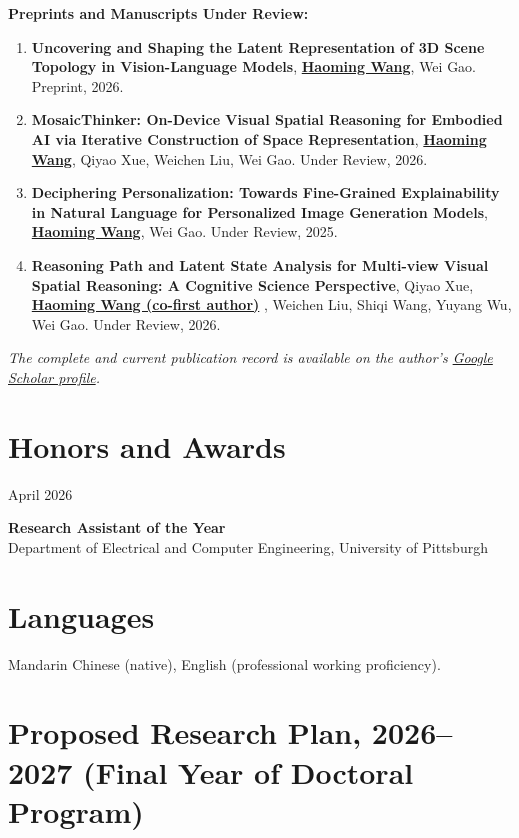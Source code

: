 \documentclass[11pt, letterpaper]{article}
\newenvironment{datedentry}[1]{%
  \par\noindent
  \begin{minipage}[t]{2.8cm}\raggedright\small #1\end{minipage}%
  \hspace{0.3cm}%
  \begin{minipage}[t]{\dimexpr\linewidth-3.1cm\relax}\raggedright
}{\end{minipage}\par\medskip}
\newenvironment{publist}{
  \begin{enumerate}[leftmargin=1.7em, itemsep=4pt, parsep=0pt, topsep=2pt,
                    label=\arabic*.]
}{\end{enumerate}}
\newcommand{\me}{\underline{\textbf{Haoming Wang}}}
\newcommand{\meco}{\underline{\textbf{Haoming Wang (co-first author)}} }
\begin{document}
\vspace{4pt}
\noindent\textbf{Preprints and Manuscripts Under Review:}
\begin{publist}
\item \textbf{Uncovering and Shaping the Latent Representation of 3D Scene Topology in Vision-Language Models}, \me, Wei Gao. Preprint, 2026.

\item \textbf{MosaicThinker: On-Device Visual Spatial Reasoning for Embodied AI via Iterative Construction of Space Representation}, \me, Qiyao Xue, Weichen Liu, Wei Gao. Under Review, 2026.

\item \textbf{Deciphering Personalization: Towards Fine-Grained Explainability in Natural Language for Personalized Image Generation Models}, \me, Wei Gao. Under Review, 2025.

\item \textbf{Reasoning Path and Latent State Analysis for Multi-view Visual Spatial Reasoning: A Cognitive Science Perspective}, Qiyao Xue, \meco, Weichen Liu, Shiqi Wang, Yuyang Wu, Wei Gao. Under Review, 2026.
\end{publist}

\vspace{2pt}
\noindent\small\textit{The complete and current publication record is available on the author's \href{https://scholar.google.com.hk/citations?user=bf6LCjUAAAAJ}{Google Scholar profile}.}
\normalsize

\section{Honors and Awards}

\begin{datedentry}{April 2026}
\textbf{Research Assistant of the Year}\\
Department of Electrical and Computer Engineering, University of Pittsburgh
\end{datedentry}

\section{Languages}
Mandarin Chinese (native), English (professional working proficiency).

\newpage

\section{Proposed Research Plan, 2026--2027 (Final Year of Doctoral Program)}
\end{document}
